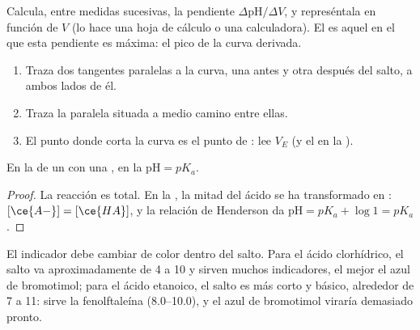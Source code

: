 \begin{method}\label{met:g12:ph-conductivity-titrations:derivative}
Calcula, entre medidas sucesivas, la pendiente
$\Delta\mathrm{pH}/\Delta V$, y represéntala en función de $V$ (lo hace
una hoja de cálculo o una calculadora). El  es
aquel en el que esta pendiente es máxima: el pico de la curva derivada.
\end{method}

\begin{method}\label{met:g12:ph-conductivity-titrations:tangent}
\begin{enumerate}
  \item Traza dos tangentes paralelas a la curva, una antes y otra
        después del salto, a ambos lados de él.
  \item Traza la paralela situada a medio camino entre ellas.
  \item El punto donde corta la curva es el punto de : lee
        $V_E$ (y el  en la ).
\end{enumerate}
\end{method}

\begin{proposition}[En la semiequivalencia, $\mathrm{pH} = pK_a$]\label{prop:g12:ph-conductivity-titrations:half}
En la  de un   con una , en la
 $\mathrm{pH} = pK_a$.
\end{proposition}

\begin{proof}
La reacción  es total. En la ,
la mitad del ácido se ha transformado en : $[\ce{A-}] = [\ce{HA}]$,
y la relación de Henderson da $\mathrm{pH} = pK_a + \log 1 = pK_a$.
\end{proof}

\begin{remark}\label{rem:g12:ph-conductivity-titrations:indicator}
El indicador debe cambiar de color dentro del salto. Para el ácido
clorhídrico, el salto va aproximadamente de  4 a 10 y sirven muchos
indicadores, el mejor el azul de bromotimol; para el ácido etanoico, el
salto es más corto y básico, alrededor de 7 a 11: sirve la fenolftaleína
(8.0--10.0), y el azul de bromotimol viraría demasiado pronto.
\end{remark}


